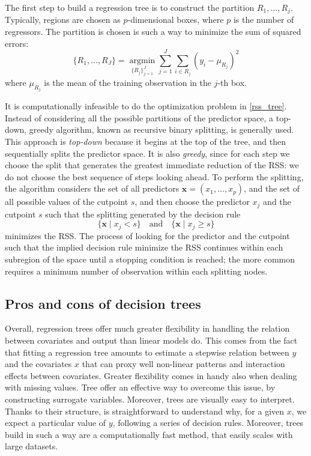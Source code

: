 \documentclass[a4paper,11pt]{article}
\begin{document}
The first step to build a regression tree is to construct the partition $R_1,..., R_j$. Typically, regions are chosen as $p$-dimensional boxes, where $p$ is the number of regressors. The partition is chosen is such a way to minimize the sum of squared errors:  
\begin{equation}
  \{R_1,...,R_J \}=\operatorname*{argmin}_{ \{R_j\}_{j=1}^J}\sum^J_{j=1}\sum_{i\in R_j}\left(y_i-\mu_{R_j}\right)^2
  \label{rss_tree}
\end{equation}
where $\mu_{R_j}$ is the mean of the training observation in the $j$-th box.

It is computationally infeasible to do the optimization problem in \eqref{rss_tree}. Instead of considering all the possible partitions of the predictor space, a top-down, greedy algorithm, known as recursive binary splitting, is generally used. This approach is \textit{top-down} because it begins at the top of the tree, and then sequentially splits the predictor space. It is also \textit{greedy}, since for each step we choose the split that generates the greatest immediate reduction of the RSS: we do not choose the best sequence of steps looking ahead. To perform the splitting, the algorithm considers the set of all predictors $ \mathbf{x}= (x_1, \ldots, x_p)$, and the set of all possible values of the cutpoint $s$, and then choose the predictor $x_j$ and the cutpoint $s$ such that the splitting generated by the decision rule  $$\{\mathbf{x} \mid x_j < s\} \quad \text{and} \quad \{\mathbf{x} \mid x_j \geq s\}$$ minimizes the RSS.
The process of looking for the predictor and the cutpoint such that the implied decision rule minimize the RSS continues within each subregion of the space until a stopping condition is reached; the more common requires a minimum number of observation within each splitting nodes.

\subsection{Pros and cons of decision trees}
Overall, regression trees offer much greater flexibility in handling the relation between covariates and output than linear models do. This comes from the fact that fitting a regression tree amounts to estimate a stepwise relation between $y$ and the covariates $x$ that can proxy well non-linear patterns and interaction effects between covariates. Greater flexibility comes in handy also when dealing with missing values. Tree offer an effective way to overcome this issue, by constructing surrogate variables.
Moreover, trees are visually easy to interpret. Thanks to their structure, is straightforward to understand why, for a given $x$, we expect a particular value of $y$, following a series of decision rules. Moreover, trees build in such a way are a computationally fast method, that easily scales with large datasets.
\end{document}

